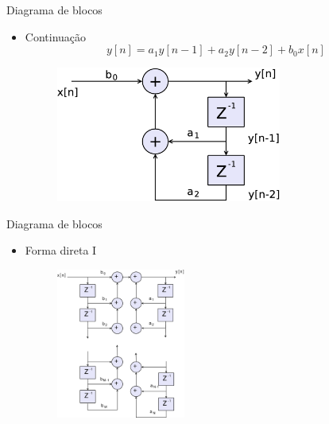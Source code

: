 \begin{slide}{Diagrama de blocos}
\begin{itemize}
     \item Continuação
      \begin{equation*}
        y[n]= a_1y[n-1]+a_2y[n-2]+b_0x[n] 
    \end{equation*}
   \begin{figure}
       \centering
        \includegraphics[width = 0.7\textwidth]{figs/ex2.eps}
   \end{figure}


\end{itemize}
\end{slide}

\begin{slide}{Diagrama de blocos}
\begin{itemize}
     \item Forma direta I
   \begin{figure}
       \centering
        \includegraphics[width = 0.4\textwidth]{figs/fd1.eps}
   \end{figure}
   

\end{itemize}
\end{slide}

